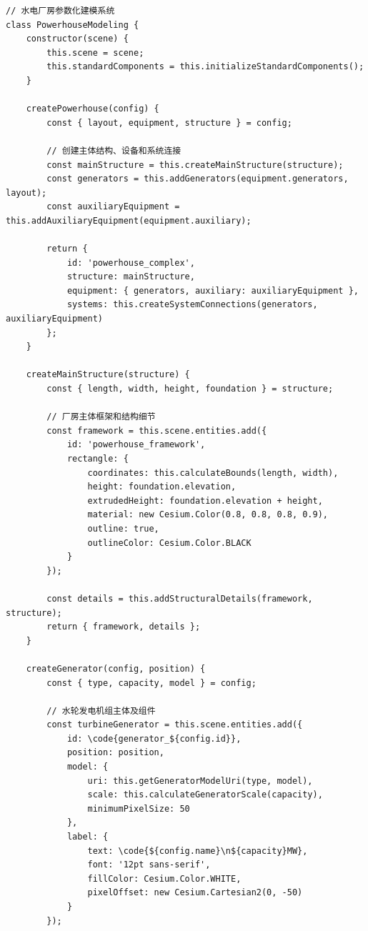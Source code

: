 \begin{lstlisting}[style=javascript]
// 水电厂房参数化建模系统
class PowerhouseModeling {
    constructor(scene) {
        this.scene = scene;
        this.standardComponents = this.initializeStandardComponents();
    }
    
    createPowerhouse(config) {
        const { layout, equipment, structure } = config;
        
        // 创建主体结构、设备和系统连接
        const mainStructure = this.createMainStructure(structure);
        const generators = this.addGenerators(equipment.generators, layout);
        const auxiliaryEquipment = this.addAuxiliaryEquipment(equipment.auxiliary);
        
        return {
            id: 'powerhouse_complex',
            structure: mainStructure,
            equipment: { generators, auxiliary: auxiliaryEquipment },
            systems: this.createSystemConnections(generators, auxiliaryEquipment)
        };
    }
    
    createMainStructure(structure) {
        const { length, width, height, foundation } = structure;
        
        // 厂房主体框架和结构细节
        const framework = this.scene.entities.add({
            id: 'powerhouse_framework',
            rectangle: {
                coordinates: this.calculateBounds(length, width),
                height: foundation.elevation,
                extrudedHeight: foundation.elevation + height,
                material: new Cesium.Color(0.8, 0.8, 0.8, 0.9),
                outline: true,
                outlineColor: Cesium.Color.BLACK
            }
        });
        
        const details = this.addStructuralDetails(framework, structure);
        return { framework, details };
    }
    
    createGenerator(config, position) {
        const { type, capacity, model } = config;
        
        // 水轮发电机组主体及组件
        const turbineGenerator = this.scene.entities.add({
            id: \code{generator_${config.id}},
            position: position,
            model: {
                uri: this.getGeneratorModelUri(type, model),
                scale: this.calculateGeneratorScale(capacity),
                minimumPixelSize: 50
            },
            label: {
                text: \code{${config.name}\n${capacity}MW},
                font: '12pt sans-serif',
                fillColor: Cesium.Color.WHITE,
                pixelOffset: new Cesium.Cartesian2(0, -50)
            }
        });
        

\end{lstlisting}
